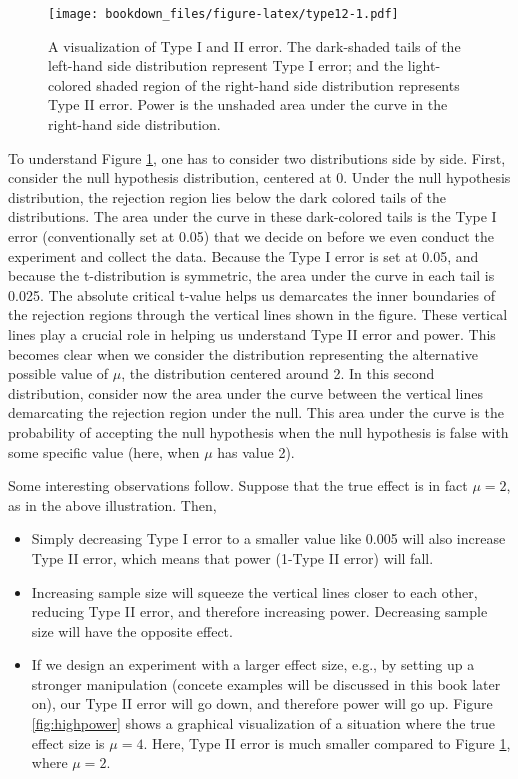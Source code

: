 \documentclass[12pt,]{krantz}
\providecommand{\tightlist}{%
  \setlength{\itemsep}{0pt}\setlength{\parskip}{0pt}}
\begin{document}
\begin{figure}
\centering
\texttt{[image: bookdown\_files/figure-latex/type12-1.pdf]}
\caption{\label{fig:type12}A visualization of Type I and II error. The dark-shaded tails of the left-hand side distribution represent Type I error; and the light-colored shaded region of the right-hand side distribution represents Type II error. Power is the unshaded area under the curve in the right-hand side distribution.}
\end{figure}

To understand Figure \ref{fig:type12}, one has to consider two distributions side by side. First, consider the null hypothesis distribution, centered at 0. Under the null hypothesis distribution, the rejection region lies below the dark colored tails of the distributions. The area under the curve in these dark-colored tails is the Type I error (conventionally set at 0.05) that we decide on before we even conduct the experiment and collect the data. Because the Type I error is set at 0.05, and because the t-distribution is symmetric, the area under the curve in each tail is 0.025. The absolute critical t-value helps us demarcates the inner boundaries of the rejection regions through the vertical lines shown in the figure. These vertical lines play a crucial role in helping us understand Type II error and power. This becomes clear when we consider the distribution representing the alternative possible value of \(\mu\), the distribution centered around 2. In this second distribution, consider now the area under the curve between the vertical lines demarcating the rejection region under the null. This area under the curve is the probability of accepting the null hypothesis when the null hypothesis is false with some specific value (here, when \(\mu\) has value 2).

Some interesting observations follow. Suppose that the true effect is in fact \(\mu=2\), as in the above illustration. Then,

\begin{itemize}
\tightlist
\item
  Simply decreasing Type I error to a smaller value like 0.005 will also increase Type II error, which means that power (1-Type II error) will fall.
\item
  Increasing sample size will squeeze the vertical lines closer to each other, reducing Type II error, and therefore increasing power. Decreasing sample size will have the opposite effect.
\item
  If we design an experiment with a larger effect size, e.g., by setting up a stronger manipulation (concete examples will be discussed in this book later on), our Type II error will go down, and therefore power will go up. Figure \ref{fig:highpower} shows a graphical visualization of a situation where the true effect size is \(\mu=4\). Here, Type II error is much smaller compared to Figure \ref{fig:type12}, where \(\mu=2\).
\end{itemize}
\end{document}
